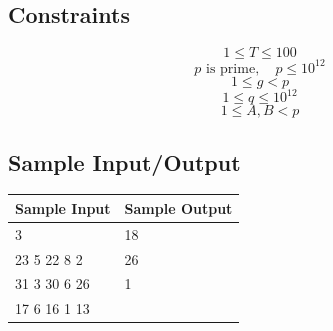 \documentclass{article}
\begin{document}
\subsection{Constraints}

$$1 \leq T \leq 100$$
$$p \text{ is prime},\quad p \leq 10^{12}$$
$$1 \leq g < p$$
$$1 \leq q \leq 10^{12}$$
$$1 \leq A, B < p$$

\subsection{Sample Input/Output}

\begin{center}
    \begin{tabular}{ |l|l| }
        \hline
        Sample Input & Sample Output \\
        \hline
        3                & 18 \\
        23 5 22 8 2      & 26 \\
        31 3 30 6 26     & 1  \\
        17 6 16 1 13     &    \\
        \hline
    \end{tabular}
\end{center}
\end{document}
